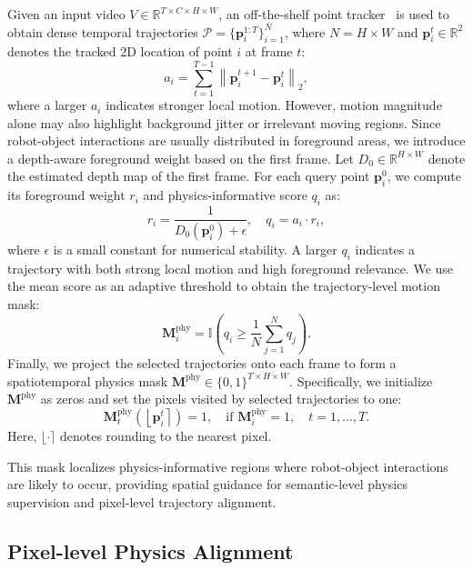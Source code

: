 \documentclass{llmxive}
\begin{document}
Given an input video $V\in\mathbb{R}^{T\times C\times H\times W}$, an off-the-shelf point
tracker~\cite{karaev24cotracker3} is used to obtain dense temporal trajectories
$\mathcal{P}=\{\mathbf{p}_i^{1:T}\}_{i=1}^{N}$, where $N=H\times W$ and
$\mathbf{p}_i^t\in\mathbb{R}^2$ denotes the tracked 2D location of point $i$ at frame $t$:
\begin{equation}
a_i=\sum_{t=1}^{T-1}\left\|\mathbf{p}_i^{t+1}-\mathbf{p}_i^{t}\right\|_2 ,
\end{equation}
where a larger $a_i$ indicates stronger local motion. However, motion magnitude alone may also
highlight background jitter or irrelevant moving regions. Since robot-object interactions are usually
distributed in foreground areas, we introduce a depth-aware foreground weight based on the first
frame. Let $D_0\in\mathbb{R}^{H\times W}$ denote the estimated depth map of the first frame. For each
query point $\mathbf{p}_i^0$, we compute its foreground weight $r_i$ and physics-informative score $q_i$ as:
\begin{equation}
r_i=\frac{1}{D_0(\mathbf{p}_i^0)+\epsilon},
\quad
q_i=a_i\cdot r_i ,
\end{equation}
where $\epsilon$ is a small constant for numerical stability. A larger $q_i$ indicates a trajectory with
both strong local motion and high foreground relevance. We use the mean score as an adaptive threshold to obtain the trajectory-level motion mask:
\begin{equation}
\mathbf{M}^{\mathrm{phy}}_i=\mathbb{I}\left(q_i \geq \frac{1}{N}\sum_{j=1}^{N}q_j\right).
\end{equation}
Finally, we project the selected trajectories onto each frame to form a spatiotemporal physics mask
$\mathbf{M}^{\mathrm{phy}}\in\{0,1\}^{T\times H\times W}$. Specifically, we initialize $\mathbf{M}^{\mathrm{phy}}$ as zeros and set
the pixels visited by selected trajectories to one:
\begin{equation}
\mathbf{M}^{\mathrm{phy}}_t\left(\left\lfloor \mathbf{p}_i^t \right\rceil\right)=1,
\quad \text{if } \mathbf{M}^{\mathrm{phy}}_i=1,\quad t=1,\dots,T .
\end{equation}
Here, $\lfloor \cdot \rceil$ denotes rounding to the nearest pixel.

This mask localizes physics-informative regions where robot-object interactions are likely to occur,
providing spatial guidance for semantic-level physics supervision and pixel-level trajectory alignment.

\subsection{Pixel-level Physics Alignment}
\end{document}
